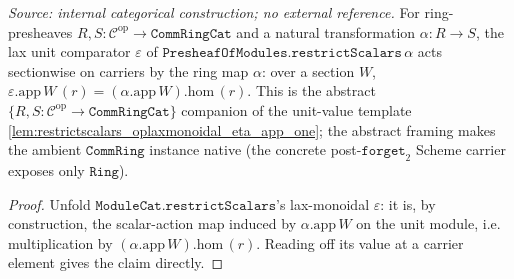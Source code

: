 \begin{lemma}\leanok
  \label{lem:restrictscalars_laxmonoidal_eps_app}
  \textit{Source: internal categorical construction; no external reference.}
  For ring-presheaves \(R, S : \mathcal C^{\mathrm{op}} \to \mathtt{CommRingCat}\) and a natural
  transformation \(\alpha : R \to S\), the lax unit comparator \(\varepsilon\) of
  \(\mathtt{PresheafOfModules.restrictScalars}\,\alpha\) acts sectionwise on carriers by the ring map
  \(\alpha\): over a section \(W\), \(\varepsilon.\mathrm{app}\,W\,(r) = (\alpha.\mathrm{app}\,W).\mathrm{hom}\,(r)\).
  This is the abstract \(\{R,S : \mathcal C^{\mathrm{op}} \to \mathtt{CommRingCat}\}\) companion of the
  unit-value template \cref{lem:restrictscalars_oplaxmonoidal_eta_app_one}; the abstract framing makes
  the ambient \(\mathtt{CommRing}\) instance native (the concrete post-\(\mathtt{forget}_2\) Scheme
  carrier exposes only \(\mathtt{Ring}\)).
\end{lemma}
\begin{proof}
  \leanok
  Unfold \(\mathtt{ModuleCat.restrictScalars}\)'s lax-monoidal \(\varepsilon\): it is, by construction,
  the scalar-action map induced by \(\alpha.\mathrm{app}\,W\) on the unit module, i.e. multiplication by
  \((\alpha.\mathrm{app}\,W).\mathrm{hom}\,(r)\). Reading off its value at a carrier element gives the
  claim directly.
\end{proof}

